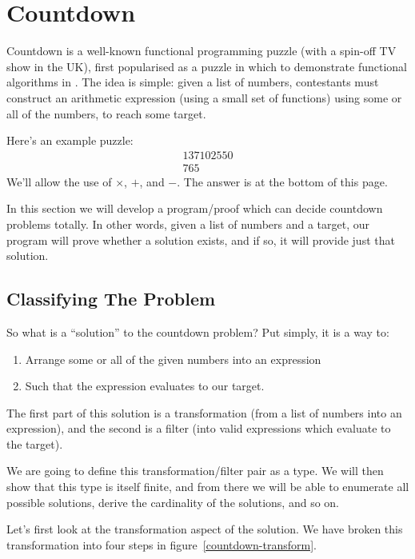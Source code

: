 \chapter{Countdown}
Countdown is a well-known functional programming puzzle (with a spin-off TV show
in the UK), first popularised as a puzzle in which to demonstrate functional
algorithms in \cite{huttonCountdownProblem2002}.
The idea is simple: given a list of numbers, contestants must construct an
arithmetic expression (using a small set of functions) using some or all of the
numbers, to reach some target.

Here's an example puzzle:
\begin{gather*}
  \boxed{1} \boxed{3} \boxed{7} \boxed{10} \boxed{25} \boxed{50} \\
  \boxed{765} \tag{Target}
\end{gather*}
We'll allow the use of \(\times\), \(+\), and \(-\).
The answer is at the bottom of this page\footnotemark.


In this section we will develop a program/proof which can decide countdown
problems totally.
In other words, given a list of numbers and a target, our program will prove
whether a solution exists, and if so, it will provide just that solution.
\section{Classifying The Problem}
So what is a ``solution'' to the countdown problem?
Put simply, it is a way to:
\begin{enumerate}
  \item Arrange some or all of the given numbers into an expression
  \item Such that the expression evaluates to our target.
\end{enumerate}
The first part of this solution is a transformation (from a list of numbers into
an expression), and the second is a filter (into valid expressions which
evaluate to the target).

We are going to define this transformation/filter pair as a type.
We will then show that this type is itself finite, and from there we will be
able to enumerate all possible solutions, derive the cardinality of the
solutions, and so on.



Let's first look at the transformation aspect of the solution.
We have broken this transformation into four steps in
figure~\ref{countdown-transform}.

